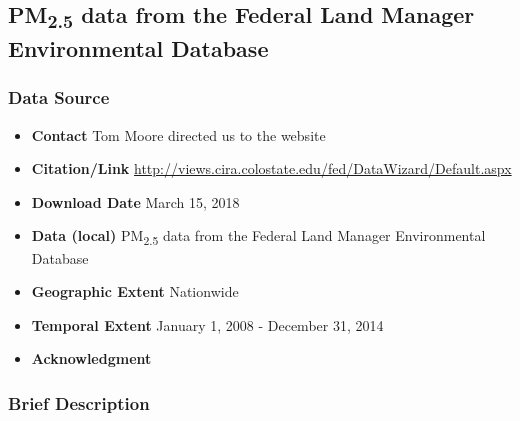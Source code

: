 \subsection{\texorpdfstring{PM\textsubscript{2.5}}{} data from the Federal Land Manager Environmental Database}

\subsubsection*{Data Source}

\begin{itemize}[nolistsep]
\item \textbf{Contact} Tom Moore directed us to the website
\item \textbf{Citation/Link} \url{http://views.cira.colostate.edu/fed/DataWizard/Default.aspx}
\item \textbf{Download Date} March 15, 2018%
\item \textbf{Data (local)} PM\textsubscript{2.5} data from the Federal Land Manager Environmental Database
\item \textbf{Geographic Extent} Nationwide
\item \textbf{Temporal Extent} January 1, 2008 - December 31, 2014
\item \textbf{Acknowledgment} 
\end{itemize}

\subsubsection*{Brief Description}

